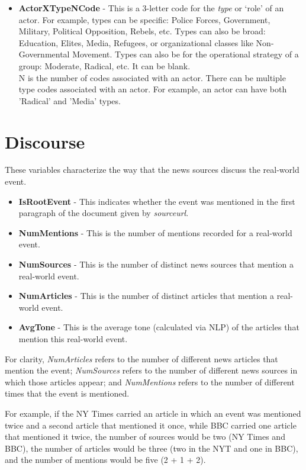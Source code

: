 \begin{itemize}
  \item \textbf{ActorXTypeNCode} - This is a 3-letter code for the \textit{type} or `role' of an actor. For example, types can be specific: Police Forces, Government, Military, Political Opposition, Rebels, etc. Types can also be broad: Education, Elites, Media, Refugees, or organizational classes like Non-Governmental Movement. Types can also be for the operational strategy of a group: Moderate, Radical, etc. It can be blank.
  \\ N is the number of codes associated with an actor. There can be multiple type codes associated with an actor. For example, an actor can have both 'Radical' and 'Media' types.
\end {itemize}

\section{Discourse}
These variables characterize the way that the news sources discuss the real-world event.
   \begin{itemize} 
     \item \textbf{IsRootEvent} - This indicates whether the event was mentioned in the first paragraph of the document given by \textit{sourceurl}.
     \item \textbf{NumMentions} - This is the number of mentions recorded for a real-world event.
     \item \textbf{NumSources} - This is the number of distinct news sources that mention a real-world event.
     \item \textbf{NumArticles} - This is the number of distinct articles that mention a real-world event.
     \item \textbf{AvgTone} - This is the average tone (calculated via NLP) of the articles that mention this real-world event.
 \end{itemize}

\par For clarity, \textit{NumArticles} refers to the number of different news articles that mention the event; \textit{NumSources} refers to the number of different news sources in which those articles appear; and \textit{NumMentions} refers to the number of different times that the event is mentioned. 
\par For example, if the NY Times carried an article in which an event was mentioned twice and a second article that mentioned it once, while BBC carried one article that mentioned it twice, the number of sources would be two (NY Times and BBC), the number of articles would be three (two in the NYT and one in BBC), and the number of mentions would be five (2 + 1 + 2). 

